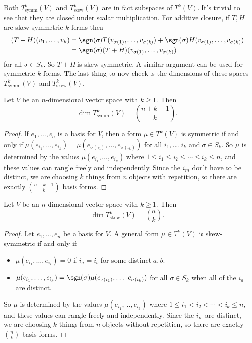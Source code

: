 Both $T^k_{\mathrm{symm}}(V)$ and $T^k_{\mathrm{skew}}(V)$ are in fact subspaces of $T^k(V)$. It's trivial to see that they are closed under scalar multiplication. For additive closure, if $T, H$ are skew-symmetric $k$-forms then
\[
  \begin{aligned}
  (T+H)(v_1,\ldots, v_k) &= \sgn(\sigma)T(v_{\sigma(1)},\ldots, v_{\sigma(k)})+\sgn(\sigma)H(v_{\sigma(1)},\ldots,v_{\sigma(k)})\\
  &= \sgn(\sigma)(T+H)(v_{\sigma(1)},\ldots, v_{\sigma(k)})
  \end{aligned}
\]
for all $\sigma\in S_k$. So $T+H$ is skew-symmetric. A similar argument can be used for symmetric $k$-forms. The last thing to now check is the dimensions of these spaces $T^k_{\mathrm{symm}}(V)$ and $T^k_{\mathrm{skew}}(V)$.

\begin{proposition}\label{dimsymm}
  Let $V$ be an $n$-dimensional vector space with $k\geq 1$. Then
  \[
    \dim T^k_{\mathrm{symm}}(V) = \binom{n+k-1}{k}
  .\]   
\end{proposition}
\begin{proof}
  If $e_1,\ldots,e_n$ is a basis for $V$, then a form $\mu\in T^k(V)$ is symmetric if and only if $\mu(e_{i_1},\ldots, e_{i_k})=\mu(e_{\sigma(i_1)},\ldots, e_{\sigma(i_k)})$ for all $i_1,\ldots, i_k$ and $\sigma\in S_k$. So $\mu$ is determined by the values $\mu(e_{i_1},\ldots, e_{i_k})$ where $1\leq i_1\leq i_2\leq\cdots\leq i_k\leq n$, and these values can rangle freely and independently. Since the $i_m$ don't have to be distinct, we are choosing $k$ things from $n$ objects with repetition, so there are exactly $\binom{n+k-1}{k}$ basis forms. 
\end{proof}

\begin{proposition}\label{dimskew}
  Let $V$ be an $n$-dimensional vector space with $k\geq 1$. Then
  \[
    \dim T^k_{\mathrm{skew}}(V) = \binom{n}{k}
  .\]   
\end{proposition}
\begin{proof}
  Let $e_1,\ldots, e_n$ be a basis for $V$. A general form $\mu\in T^k(V)$ is skew-symmetric if and only if:
  \begin{itemize}
    \item $\mu(e_{i_1},\ldots,e_{i_k})=0$ if $i_a=i_b$ for some distinct $a,b$.
    \item $\mu(e_{i_1},\ldots,e_{i_k})=\sgn(\sigma)\mu(e_{\sigma(i_1)},\ldots,e_{\sigma(i_k)})$ for all $\sigma\in S_k$ when all of the $i_a$ are distinct. 
  \end{itemize}
  So $\mu$ is determined by the values $\mu(e_{i_1},\ldots, e_{i_k})$ where $1\leq i_1< i_2<\cdots< i_k\leq n$, and these values can rangle freely and independently. Since the $i_m$ are distinct, we are choosing $k$ things from $n$ objects without repetition, so there are exactly $\binom{n}{k}$ basis forms. 
\end{proof}

